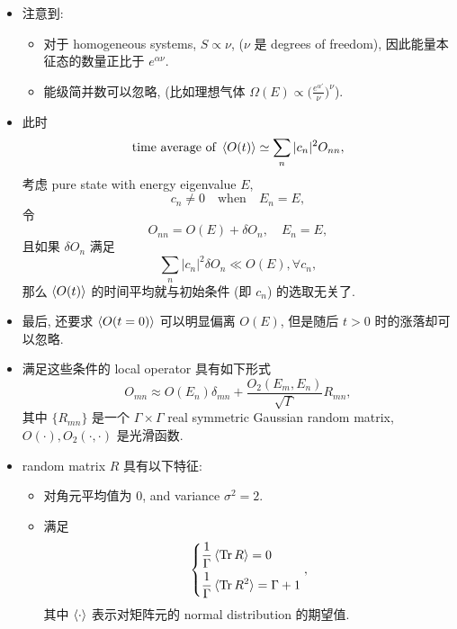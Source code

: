 \begin{itemize}
	\item 注意到:
	\begin{itemize}
		\item 对于 homogeneous systems, $S \propto \nu$, ($\nu$ 是 degrees of freedom), 因此能量本征态的数量正比于 $e^{\alpha \nu}$.
		
		\item 能级简并数可以忽略, (比如理想气体 $\Omega(E) \propto \big( \frac{e^{\alpha'}}{\nu} \big)^\nu$).
	\end{itemize}
	
	\item 此时
	\begin{equation}
		\text{time average of} \ \braket{O(t)} \simeq \sum_n |c_n|^2 O_{n n},
	\end{equation}
	考虑 pure state with energy eigenvalue $E$,
	\begin{equation}
		c_n \neq 0 \quad \text{when} \quad E_n = E,
	\end{equation}
	令
	\begin{equation}
		O_{n n} = O(E) + \delta O_n, \quad E_n = E,
	\end{equation}
	且如果 $\delta O_n$ 满足
	\begin{equation}
		\sum_n |c_n|^2 \delta O_n \ll O(E), \forall c_n,
	\end{equation}
	那么 $\braket{O(t)}$ 的时间平均就与初始条件 (即 $c_n$) 的选取无关了.
	
	\item 最后, 还要求 $\braket{O(t = 0)}$ 可以明显偏离 $O(E)$, 但是随后 $t > 0$ 时的涨落却可以忽略.
	
	\noindent\hdashrule[0.5ex]{\linewidth}{0.5pt}{1mm} %
	
	\item 满足这些条件的 local operator 具有如下形式
	\begin{equation}
		O_{m n} \approx O(E_n) \delta_{m n} + \frac{O_2(E_m, E_n)}{\sqrt{\Gamma}} R_{m n},
	\end{equation}
	其中 $\{R_{m n}\}$ 是一个 $\Gamma \times \Gamma$ real symmetric Gaussian random matrix, $O(\cdot), O_2(\cdot, \cdot)$ 是光滑函数.
	
	\item random matrix $R$ 具有以下特征:
	\begin{itemize}
		\item 对角元平均值为 $0$, and variance $\sigma^2 = 2$.
		
		\item 满足
		\begin{equation} \label{5.5.9}
			\begin{dcases}
				\frac{1}{\Gamma} \braket{\mathrm{Tr} \, R} = 0 \\
				\frac{1}{\Gamma} \braket{\mathrm{Tr} \, R^2} = \Gamma + 1
			\end{dcases},
		\end{equation}
		其中 $\braket{\cdot}$ 表示对矩阵元的 normal distribution 的期望值.
		

\end{itemize}
\end{itemize}
